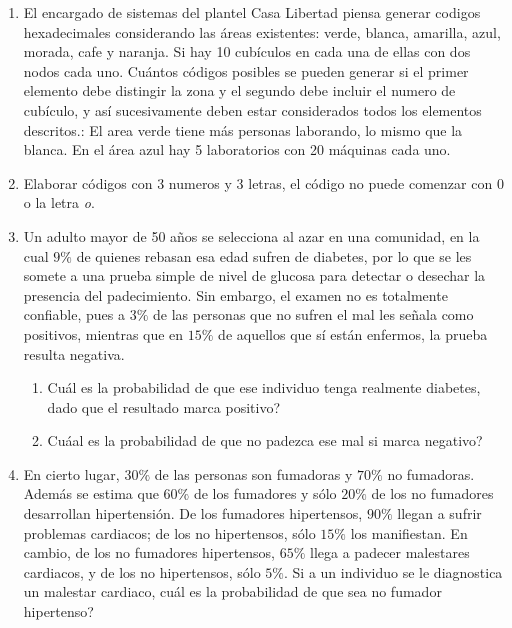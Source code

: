 \begin{Ejer}
\begin{enumerate}
\item El encargado de sistemas del plantel Casa Libertad piensa generar codigos hexadecimales considerando las \'areas existentes: verde, blanca, amarilla, azul, morada, cafe y naranja. Si hay 10 cub\'iculos en cada una de ellas con dos nodos cada uno. Cu\'antos c\'odigos posibles se pueden generar si el primer elemento debe distingir la zona y el segundo debe incluir el numero de cub\'iculo, y as\'i sucesivamente deben estar considerados todos los elementos descritos.: El area verde tiene m\'as personas laborando, lo mismo que la blanca.  En el \'area azul hay 5 laboratorios con 20 m\'aquinas cada uno.


\item Elaborar c\'odigos con 3 numeros y 3 letras, el c\'odigo no puede comenzar con $0$ o la letra \textit{o}.



\item Un adulto mayor de 50 a\~nos se selecciona al azar en una comunidad, en la cual $9\%$ de quienes rebasan esa edad sufren de diabetes, por lo que se les somete a una prueba simple de nivel de glucosa para detectar o desechar la presencia del padecimiento. Sin embargo, el examen no es totalmente confiable, pues a $3\%$ de las personas que no sufren el mal les se\~nala como positivos, mientras que en $15\%$ de aquellos que s\'i est\'an enfermos, la prueba resulta negativa.

\begin{enumerate}
\item Cu\'al es la probabilidad de que ese individuo tenga realmente diabetes, dado que el resultado marca positivo?
\item Cu\'aal es la probabilidad de que no padezca ese mal si marca negativo?
\end{enumerate}

\item En cierto lugar, $30\%$ de las personas son fumadoras y $70\%$ no fumadoras. Adem\'as se estima que $60\%$ de los fumadores y s\'olo $20\%$ de los no fumadores desarrollan hipertensi\'on. De los fumadores hipertensos, $90\%$ llegan a sufrir problemas cardiacos; de los no hipertensos, s\'olo $15\%$ los manifiestan. En cambio, de los no fumadores hipertensos, $65\%$ llega a padecer malestares cardiacos, y de los no hipertensos, s\'olo $5\%$. Si a un individuo se le diagnostica un malestar cardiaco,  cu\'al es la probabilidad de que sea no fumador hipertenso?

\end{enumerate}
\end{Ejer}



